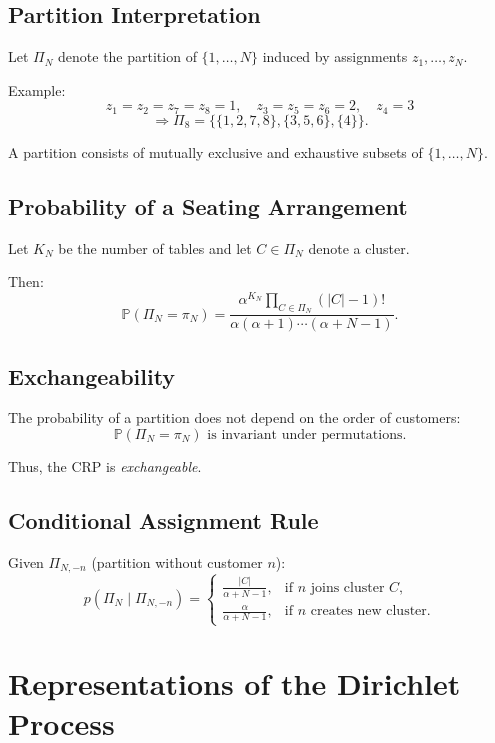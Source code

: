 \documentclass[12pt,oneside]{book}
\numberwithin{equation}{section}
\theoremstyle{definition}
\theoremstyle{plain}
\theoremstyle{remark}
\begin{document}
\subsection*{Partition Interpretation}

Let $\Pi_N$ denote the partition of $\{1,\dots,N\}$ induced by assignments $z_1,\dots,z_N$.

Example:
\[
z_1 = z_2 = z_7 = z_8 = 1,\quad
z_3 = z_5 = z_6 = 2,\quad
z_4 = 3
\]
\[
\Rightarrow
\Pi_8 = \{\{1,2,7,8\}, \{3,5,6\}, \{4\}\}.
\]

A partition consists of mutually exclusive and exhaustive subsets of $\{1,\dots,N\}$.

\subsection*{Probability of a Seating Arrangement}

Let $K_N$ be the number of tables and let $C \in \Pi_N$ denote a cluster.

Then:
\[
\mathbb{P}(\Pi_N = \pi_N)
=
\frac{\alpha^{K_N} \prod_{C \in \Pi_N} (|C|-1)!}{\alpha(\alpha+1)\cdots(\alpha+N-1)}.
\]

\subsection*{Exchangeability}

The probability of a partition does not depend on the order of customers:
\[
\mathbb{P}(\Pi_N = \pi_N)
\text{ is invariant under permutations.}
\]

Thus, the CRP is \emph{exchangeable}.

\subsection*{Conditional Assignment Rule}

Given $\Pi_{N,-n}$ (partition without customer $n$):
\[
p(\Pi_N \mid \Pi_{N,-n}) =
\begin{cases}
\frac{|C|}{\alpha+N-1}, & \text{if } n \text{ joins cluster } C, \\
\frac{\alpha}{\alpha+N-1}, & \text{if } n \text{ creates new cluster}.
\end{cases}
\]

\section*{Representations of the Dirichlet Process}
\end{document}
